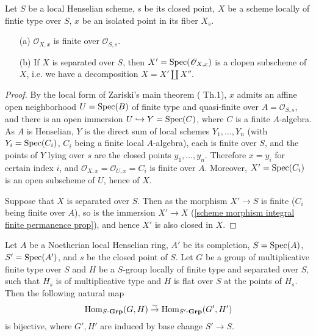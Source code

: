 \begin{lemma}\label{scheme ft over local Hensel local scheme decomposition}
Let $S$ be a local Henselian scheme, $s$ be its closed point, $X$ be a scheme locally of fintie type over $S$, $x$ be an isolated point in its fiber $X_s$.
\begin{enumerate}
    \item[(a)] $\mathscr{O}_{X,x}$ is finite over $\mathscr{O}_{S,s}$.
    \item[(b)] If $X$ is separated over $S$, then $X'=\mathrm{Spec}(\mathscr{O}_{X,x})$ is a clopen subscheme of $X$, i.e. we have a decomposition $X=X'\coprod X''$.
\end{enumerate}
\end{lemma}
\begin{proof}
By the local form of Zariski's main theorem (\cite{*}  Th.1), $x$ admits an affine open neighborhood $U=\mathrm{Spec}(B)$ of finite type and quasi-finite over $A=\mathscr{O}_{S,s}$, and there is an open immersion $U\hookrightarrow Y=\mathrm{Spec}(C)$, where $C$ is a finite $A$-algebra. As $A$ is Henselian, $Y$ is the direct sum of local schemes $Y_1,\dots,Y_n$ (with $Y_i=\mathrm{Spec}(C_i)$, $C_i$ being a finite local $A$-algebra), each is finite over $S$, and the points of $Y$ lying over $s$ are the closed points $y_1,\dots,y_n$. Therefore $x=y_i$ for certain index $i$, and $\mathscr{O}_{X,x}=\mathscr{O}_{U,x}=C_i$ is finite over $A$. Moreover, $X'=\mathrm{Spec}(C_i)$ is an open subscheme of $U$, hence of $X$.\par
Suppose that $X$ is separated over $S$. Then as the morphism $X'\to S$ is finite ($C_i$ being finite over $A$), so is the immersion $X'\to X$ (\cref{scheme morphism integral finite permanence prop}), and hence $X'$ is also closed in $X$.
\end{proof}

\begin{proposition}\label{scheme group multiplicative over local Hensel homomorphism reduction}
Let $A$ be a Noetherian local Henselian ring, $A'$ be its completion, $S=\mathrm{Spec}(A)$, $S'=\mathrm{Spec}(A')$, and $s$ be the closed point of $S$. Let $G$ be a group of multiplicative finite type over $S$ and $H$ be a $S$-group locally of finite type and separated over $S$, such that $H_s$ is of multiplicative type and $H$ is flat over $S$ at the points of $H_s$. Then the following natural map
\[\mathrm{Hom}_{S\textup{-}\mathbf{Grp}}(G,H)\stackrel{\sim}{\to}\mathrm{Hom}_{S'\textup{-}\mathbf{Grp}}(G',H')\]
is bijective, where $G',H'$ are induced by base change $S'\to S$.
\end{proposition}

